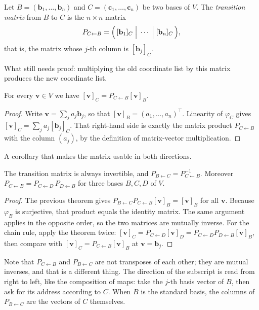 \begin{definisi}
Let $B=(\mathbf{b}_{1},\dots,\mathbf{b}_{n})$ and
$C=(\mathbf{c}_{1},\dots,\mathbf{c}_{n})$
be two bases of $V$. The \emph{transition matrix} from $B$ to $C$ is the $n\times n$ matrix
\[
P_{C\leftarrow
B}=\Bigl(\,[\mathbf{b}_{1}]_{C}\;\Big|\;\cdots\;\Big|\;[\mathbf{b}_{n}]_{C}\,\Bigr),
\]
that is, the matrix whose $j$-th column is $[\mathbf{b}_{j}]_{C}$.
\end{definisi}

What still needs proof: multiplying the old coordinate list by this matrix produces the new
coordinate
list.

\begin{teorema}
For every $\mathbf{v}\in V$ we have $[\mathbf{v}]_{C}=P_{C\leftarrow B}[\mathbf{v}]_{B}$.
\end{teorema}

\begin{proof}
Write $\mathbf{v}=\sum_{j}a_{j}\mathbf{b}_{j}$, so that
$[\mathbf{v}]_{B}=(a_{1},\dots,a_{n})^{\top}$.
Linearity of $\varphi_{C}$ gives
$[\mathbf{v}]_{C}=\sum_{j}a_{j}[\mathbf{b}_{j}]_{C}$. That right-hand side is exactly the
matrix
product $P_{C\leftarrow B}$ with the column $(a_{j})$, by the definition of matrix-vector
multiplication.
\end{proof}

A corollary that makes the matrix usable in both directions.

\begin{akibat}
The transition matrix is always invertible, and $P_{B\leftarrow C}=P_{C\leftarrow B}^{-1}$.
Moreover
$P_{C\leftarrow B}=P_{C\leftarrow D}\,P_{D\leftarrow B}$ for three bases $B,C,D$ of $V$.
\end{akibat}

\begin{proof}
The previous theorem gives $P_{B\leftarrow C}P_{C\leftarrow B}[\mathbf{v}]_{B}=[\mathbf{v}]_{B}$
for all $\mathbf{v}$. Because $\varphi_{B}$ is surjective, that product equals the identity
matrix. The same argument applies in the opposite order, so the two matrices are mutually
inverse. For the chain rule, apply the theorem twice:
$[\mathbf{v}]_{C}=P_{C\leftarrow D}[\mathbf{v}]_{D}=P_{C\leftarrow D}P_{D\leftarrow B}[\mathbf{v}]_{B}$,
then compare with $[\mathbf{v}]_{C}=P_{C\leftarrow B}[\mathbf{v}]_{B}$ at $\mathbf{v}=\mathbf{b}_{j}$.
\end{proof}

Note that $P_{C\leftarrow B}$ and $P_{B\leftarrow C}$ are not transposes of each other; they are mutual inverses, and that is a different thing. The direction of the subscript is read from right to left, like the composition of maps: take the $j$-th basis vector of $B$, then ask for its address according to $C$. When $B$ is the standard basis, the columns of $P_{B\leftarrow C}$ are the vectors of $C$ themselves.

